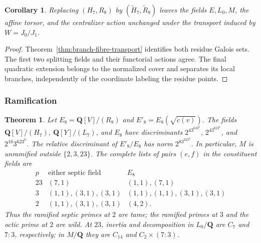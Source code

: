 \documentclass[11pt]{amsart}
\newtheorem{theorem}{Theorem}[section]
\newtheorem{corollary}[corollary]{Corollary}
\theoremstyle{definition}
\theoremstyle{remark}
\newcommand{\QQ}{\mathbf Q}
\begin{document}
\begin{corollary}\label{cor:affine}
Replacing $(H_7,R_8)$ by $(\widetilde H_7,\widetilde R_8)$ leaves the fields
$E,L_0,M$, the affine torsor, and the centralizer action unchanged under the
transport induced by $W=J_0/J_1$.
\end{corollary}

\begin{proof}
Theorem~\ref{thm:branch-fibre-transport} identifies both residue Galois
sets.  The first two
splitting fields and their functorial actions agree.  The final quadratic
extension belongs to the normalized cover and separates its local branches,
independently of the coordinate labeling the residue points.
\end{proof}

\subsubsection{Ramification}

\begin{theorem}\label{thm:ramification}
Let $E_8=\QQ[V]/(R_8)$ and $E'_8=E_8(\sqrt{c(v)})$.  The fields
$\QQ[V]/(H_7)$, $\QQ[Y]/(L_7)$, and $E_8$ have discriminants
$2^43^623^6$, $2^43^623^6$, and $2^{16}3^623^6$.  The relative
discriminant of $E'_8/E_8$ has norm $2^83^223^2$.  In particular, $M$ is
unramified outside $\{2,3,23\}$.  The complete lists of pairs $(e,f)$
in the constituent fields are
\[
\begin{array}{c|c|c}
p&\text{either septic field}&E_8\\ \hline
23&(7,1)&(1,1),(7,1)\\
3&(1,1),(3,1),(3,1)&(1,1),(1,1),(3,1),(3,1)\\
2&(1,1),(3,1),(3,1)&(4,2).
\end{array}
\]
Thus the ramified septic primes at $2$ are tame; the ramified primes at
$3$ and the octic prime at $2$ are wild.  At $23$, inertia and decomposition
in $L_0/\QQ$ are $C_7$ and $7{:}3$, respectively; in $M/\QQ$ they are
$C_{14}$ and $C_2\times(7{:}3)$.
\end{theorem}
\end{document}
